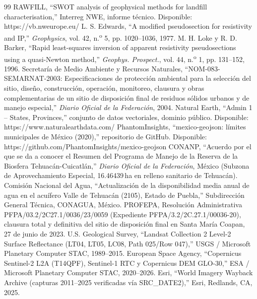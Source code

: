 \begin{thebibliography}{99}
 RAWFILL, ``SWOT analysis of geophysical methods for landfill characterisation,'' Interreg NWE, informe técnico. Disponible: https://vb.nweurope.eu/
 L. S. Edwards, ``A modified pseudosection for resistivity and IP,'' \textit{Geophysics}, vol. 42, n.\textsuperscript{o} 5, pp. 1020--1036, 1977.
 M. H. Loke y R. D. Barker, ``Rapid least-squares inversion of apparent resistivity pseudosections using a quasi-Newton method,'' \textit{Geophys. Prospect.}, vol. 44, n.\textsuperscript{o} 1, pp. 131--152, 1996.
 Secretaría de Medio Ambiente y Recursos Naturales, ``NOM-083-SEMARNAT-2003: Especificaciones de protección ambiental para la selección del sitio, diseño, construcción, operación, monitoreo, clausura y obras complementarias de un sitio de disposición final de residuos sólidos urbanos y de manejo especial,'' \textit{Diario Oficial de la Federación}, 2004.
 Natural Earth, ``Admin 1 -- States, Provinces,'' conjunto de datos vectoriales, dominio público. Disponible: https://www.naturalearthdata.com/
 PhantomInsights, ``mexico-geojson: límites municipales de México (2020),'' repositorio de GitHub. Disponible: https://github.com/PhantomInsights/mexico-geojson
 CONANP, ``Acuerdo por el que se da a conocer el Resumen del Programa de Manejo de la Reserva de la Biosfera Tehuacán-Cuicatlán,'' \textit{Diario Oficial de la Federación}, México (Subzona de Aprovechamiento Especial, 16.46439\,ha en relleno sanitario de Tehuacán).
 Comisión Nacional del Agua, ``Actualización de la disponibilidad media anual de agua en el acuífero Valle de Tehuacán (2105), Estado de Puebla,'' Subdirección General Técnica, CONAGUA, México.
 PROFEPA, Resolución Administrativa PFPA/03.2/2C27.1/0036/23/0059 (Expediente PFPA/3.2/2C.27.1/00036-20), clausura total y definitiva del sitio de disposición final en Santa María Coapan, 27 de junio de 2023.
 U.S. Geological Survey, ``Landsat Collection 2 Level-2 Surface Reflectance (LT04, LT05, LC08, Path 025/Row 047),'' USGS / Microsoft Planetary Computer STAC, 1989--2015.
 European Space Agency, ``Copernicus Sentinel-2 L2A (T14QPF), Sentinel-1 RTC y Copernicus DEM GLO-30,'' ESA / Microsoft Planetary Computer STAC, 2020--2026.
 Esri, ``World Imagery Wayback Archive (capturas 2011--2025 verificadas vía SRC\_DATE2),'' Esri, Redlands, CA, 2025.
\end{thebibliography}
